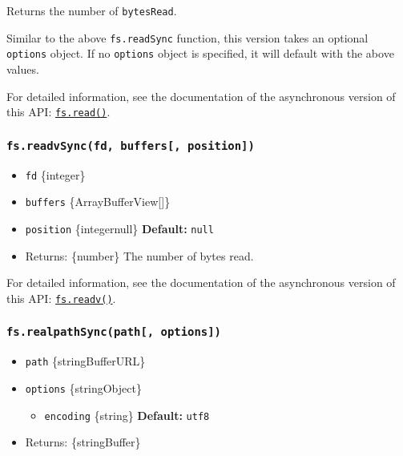 Returns the number of \texttt{bytesRead}.

Similar to the above \texttt{fs.readSync} function, this version takes
an optional \texttt{options} object. If no \texttt{options} object is
specified, it will default with the above values.

For detailed information, see the documentation of the asynchronous
version of this API:
\hyperref[fsreadfd-buffer-offset-length-position-callback]{\texttt{fs.read()}}.

\subsubsection{\texorpdfstring{\texttt{fs.readvSync(fd,\ buffers{[},\ position{]})}}{fs.readvSync(fd, buffers{[}, position{]})}}\label{fs.readvsyncfd-buffers-position}

\begin{itemize}
\tightlist
\item
  \texttt{fd} \{integer\}
\item
  \texttt{buffers} \{ArrayBufferView{[}{]}\}
\item
  \texttt{position} \{integer\textbar null\} \textbf{Default:}
  \texttt{null}
\item
  Returns: \{number\} The number of bytes read.
\end{itemize}

For detailed information, see the documentation of the asynchronous
version of this API:
\hyperref[fsreadvfd-buffers-position-callback]{\texttt{fs.readv()}}.

\subsubsection{\texorpdfstring{\texttt{fs.realpathSync(path{[},\ options{]})}}{fs.realpathSync(path{[}, options{]})}}\label{fs.realpathsyncpath-options}

\begin{itemize}
\tightlist
\item
  \texttt{path} \{string\textbar Buffer\textbar URL\}
\item
  \texttt{options} \{string\textbar Object\}

  \begin{itemize}
  \tightlist
  \item
    \texttt{encoding} \{string\} \textbf{Default:}
    \texttt{\textquotesingle{}utf8\textquotesingle{}}
  \end{itemize}
\item
  Returns: \{string\textbar Buffer\}
\end{itemize}

